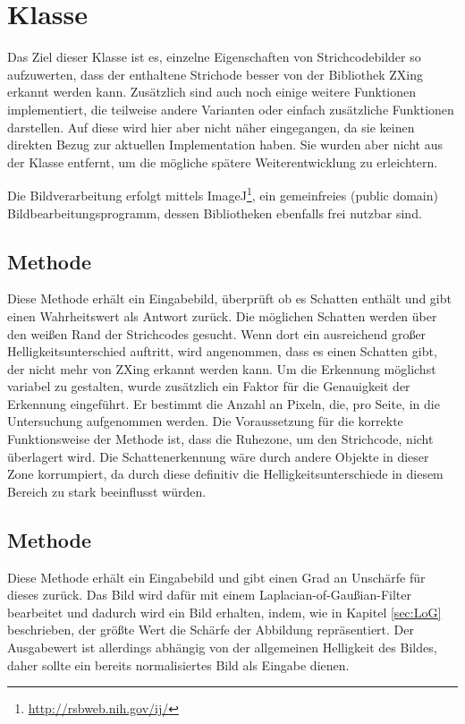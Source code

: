 \section{Klasse }
\writtenby{\dcauthornameriren}%
Das Ziel dieser Klasse ist es, einzelne Eigenschaften von Strichcodebilder so aufzuwerten, dass der enthaltene Strichode besser von der Bibliothek ZXing erkannt werden kann.
Zusätzlich sind auch noch einige weitere Funktionen implementiert, die teilweise andere Varianten oder einfach zusätzliche Funktionen darstellen. Auf diese wird hier aber nicht näher eingegangen, da sie keinen direkten Bezug zur aktuellen Implementation haben. Sie wurden aber nicht aus der Klasse entfernt, um die mögliche spätere Weiterentwicklung zu erleichtern.

Die Bildverarbeitung erfolgt mittels ImageJ\footnote{\url{http://rsbweb.nih.gov/ij/}}, ein gemeinfreies (public domain) Bildbearbeitungsprogramm, dessen Bibliotheken ebenfalls frei nutzbar sind.


\subsection*{Methode }
Diese Methode erhält ein Eingabebild, überprüft ob es Schatten enthält und gibt einen Wahrheitswert als Antwort zurück.
Die möglichen Schatten werden über den weißen Rand der Strichcodes gesucht. Wenn dort ein ausreichend großer Helligkeitsunterschied auftritt, wird angenommen, dass es einen Schatten gibt, der nicht mehr von ZXing erkannt werden kann.
Um die Erkennung möglichst variabel zu gestalten, wurde zusätzlich ein Faktor für die Genauigkeit der Erkennung eingeführt. Er bestimmt die Anzahl an Pixeln, die, pro Seite, in die Untersuchung aufgenommen werden.
Die Voraussetzung für die korrekte Funktionsweise der Methode ist, dass die Ruhezone, um den Strichcode, nicht überlagert wird. Die Schattenerkennung wäre durch andere Objekte in dieser Zone korrumpiert, da durch diese definitiv die Helligkeitsunterschiede in diesem Bereich zu stark beeinflusst würden.


\subsection*{Methode }
Diese Methode erhält ein Eingabebild und gibt einen Grad an Unschärfe für dieses zurück.
Das Bild wird dafür mit einem Laplacian-of-Gaußian-Filter bearbeitet und dadurch wird ein Bild erhalten, indem, wie in Kapitel \ref{sec:LoG} beschrieben, der größte Wert die Schärfe der Abbildung repräsentiert.
Der Ausgabewert ist allerdings abhängig von der allgemeinen Helligkeit des Bildes, daher sollte ein bereits normalisiertes Bild als Eingabe dienen.


